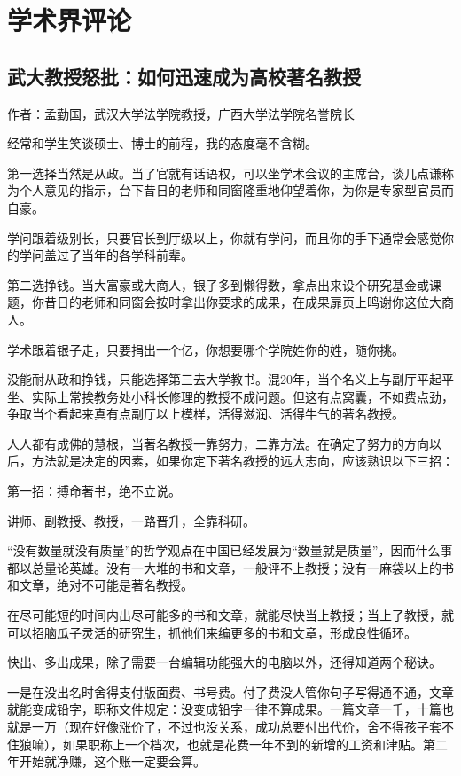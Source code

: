 \chapter{学术界评论}


\section{武大教授怒批：如何迅速成为高校著名教授}
作者：孟勤国，武汉大学法学院教授，广西大学法学院名誉院长


经常和学生笑谈硕士、博士的前程，我的态度毫不含糊。

第一选择当然是从政。当了官就有话语权，可以坐学术会议的主席台，谈几点谦称为个人意见的指示，台下昔日的老师和同窗隆重地仰望着你，为你是专家型官员而自豪。

学问跟着级别长，只要官长到厅级以上，你就有学问，而且你的手下通常会感觉你的学问盖过了当年的各学科前辈。

第二选挣钱。当大富豪或大商人，银子多到懒得数，拿点出来设个研究基金或课题，你昔日的老师和同窗会按时拿出你要求的成果，在成果扉页上鸣谢你这位大商人。

学术跟着银子走，只要捐出一个亿，你想要哪个学院姓你的姓，随你挑。

没能耐从政和挣钱，只能选择第三去大学教书。混20年，当个名义上与副厅平起平坐、实际上常挨教务处小科长修理的教授不成问题。但这有点窝囊，不如费点劲，争取当个看起来真有点副厅以上模样，活得滋润、活得牛气的著名教授。

人人都有成佛的慧根，当著名教授一靠努力，二靠方法。在确定了努力的方向以后，方法就是决定的因素，如果你定下著名教授的远大志向，应该熟识以下三招：



第一招：搏命著书，绝不立说。        



讲师、副教授、教授，一路晋升，全靠科研。


“没有数量就没有质量”的哲学观点在中国已经发展为“数量就是质量”，因而什么事都以总量论英雄。没有一大堆的书和文章，一般评不上教授；没有一麻袋以上的书和文章，绝对不可能是著名教授。

在尽可能短的时间内出尽可能多的书和文章，就能尽快当上教授；当上了教授，就可以招脑瓜子灵活的研究生，抓他们来编更多的书和文章，形成良性循环。

快出、多出成果，除了需要一台编辑功能强大的电脑以外，还得知道两个秘诀。


一是在没出名时舍得支付版面费、书号费。付了费没人管你句子写得通不通，文章就能变成铅字，职称文件规定：没变成铅字一律不算成果。一篇文章一千，十篇也就是一万（现在好像涨价了，不过也没关系，成功总要付出代价，舍不得孩子套不住狼嘛），如果职称上一个档次，也就是花费一年不到的新增的工资和津贴。第二年开始就净赚，这个账一定要会算。



